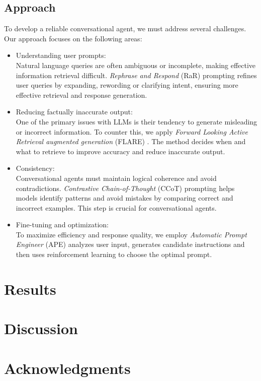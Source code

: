 \documentclass[fleqn,moreauthors,10pt]{ds_report}
\begin{document}
\subsection*{Approach}
To develop a reliable conversational agent, we must address several challenges.
Our approach focuses on the following areas:
\begin{itemize}
\item Understanding user prompts:\\
Natural language queries are often ambiguous or incomplete, making effective information retrieval difficult.
\textit{Rephrase and Respond} (RaR) \cite{RaR} prompting refines user queries by expanding, rewording or clarifying intent, ensuring more effective retrieval and response generation.
\item Reducing factually inaccurate output:\\
One of the primary issues with LLMs is their tendency to generate misleading or incorrect information. 
To counter this, we apply \textit{Forward Looking Active Retrieval augmented generation} (FLARE) \cite{FLARE}. The method decides when and what to retrieve to improve accuracy and reduce inaccurate output.
\item Consistency:\\
Conversational agents must maintain logical coherence and avoid contradictions.
\textit{Contrastive Chain-of-Thought} (CCoT) \cite{CCoT} prompting helps models identify patterns and avoid mistakes by comparing correct and incorrect examples.
This step is crucial for conversational agents.
\item Fine-tuning and optimization:\\
To maximize efficiency and response quality, we employ
\textit{Automatic Prompt Engineer} (APE) \cite{APE} analyzes user input, generates candidate instructions and then uses reinforcement learning to choose the optimal prompt. 
\end{itemize}


\section*{Results}






\section*{Discussion}



\section*{Acknowledgments}





\end{document}

